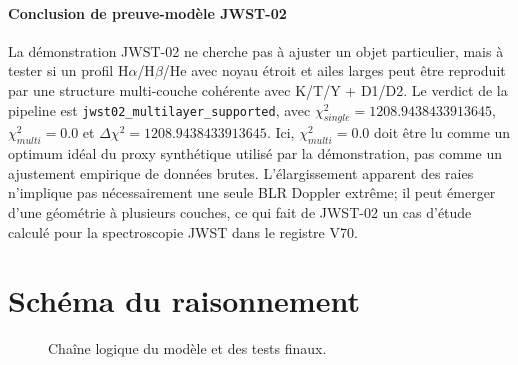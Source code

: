 \documentclass[11pt,a4paper]{article}
\begin{document}
\paragraph{Conclusion de preuve-modèle JWST-02}
La démonstration JWST-02 ne cherche pas à ajuster un objet particulier, mais à tester si un profil H$\alpha$/H$\beta$/He avec noyau étroit et ailes larges peut être reproduit par une structure multi-couche cohérente avec K/T/Y + D1/D2. Le verdict de la pipeline est \texttt{jwst02\_multilayer\_supported}, avec $\chi^2_{single}=1208.9438433913645$, $\chi^2_{multi}=0.0$ et $\Delta\chi^2=1208.9438433913645$. Ici, $\chi^2_{multi}=0.0$ doit être lu comme un optimum idéal du proxy synthétique utilisé par la démonstration, pas comme un ajustement empirique de données brutes. L'élargissement apparent des raies n'implique pas nécessairement une seule BLR Doppler extrême; il peut émerger d'une géométrie à plusieurs couches, ce qui fait de JWST-02 un cas d'étude calculé pour la spectroscopie JWST dans le registre V70.

\section{Schéma du raisonnement}
\begin{figure}[htbp]
\centering
{}
\caption{Chaîne logique du modèle et des tests finaux.}
\end{figure}
\end{document}
